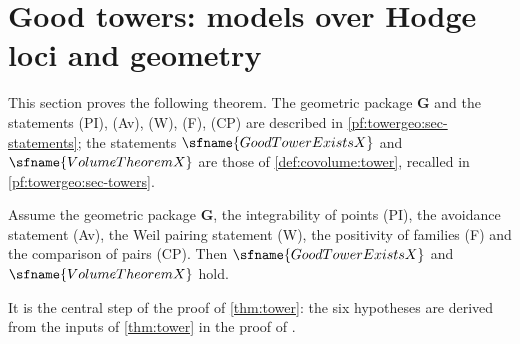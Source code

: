 \section{Good towers: models over Hodge loci and geometry}\label{sec:pf:towergeo}

\providecommand{\towergeock}{\operatorname{ck}}
\providecommand{\towergeola}{\operatorname{la}}
\providecommand{\towergeocyc}{\operatorname{cyc}}
\providecommand{\towergeoco}{\operatorname{co}}
\providecommand{\towergeodiv}{\operatorname{div}}
\providecommand{\towergeoRI}{\mathrm{RI}}
\providecommand{\towergeoHC}{\mathcal M}
\providecommand{\towergeoG}{\mathbf G}
\providecommand{\towergeoFC}{\mathrm{FC}}
\providecommand{\towergeoLC}{\mathrm{LC}}
\providecommand{\towergeoRel}{\mathrm{Rel}}
\providecommand{\towergeoTriv}{\mathrm{Triv}}
\providecommand{\towergeoTw}{\mathrm{Tw}}
\providecommand{\towergeoreg}{\phi^{\mathrm{reg}}}

This section proves the following theorem. The geometric package $\towergeoG$ and the statements
(PI), (Av), (W), (F), (CP) are described in \cref{pf:towergeo:sec-statements}; the statements
$\sfname{GoodTowerExistsX}$ and $\sfname{VolumeTheoremX}$ are those of \cref{def:covolume:tower},
recalled in \cref{pf:towergeo:sec-towers}.

\begin{theorem}\label{pf:towergeo:main}
Assume the geometric package $\towergeoG$, the integrability of points \textup{(PI)}, the avoidance
statement \textup{(Av)}, the Weil pairing statement \textup{(W)}, the positivity of families
\textup{(F)} and the comparison of pairs \textup{(CP)}. Then $\sfname{GoodTowerExistsX}$ and
$\sfname{VolumeTheoremX}$ hold.
\end{theorem}

It is the central step of the proof of \cref{thm:tower}: the six hypotheses are derived from the
inputs of \cref{thm:tower} in the proof of .

